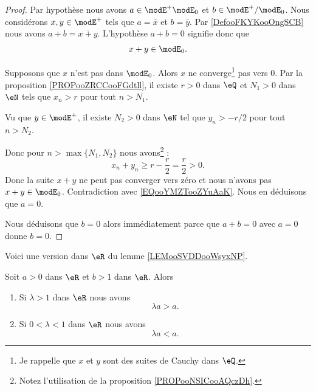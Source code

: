 \begin{proof}
	Par hypothèse nous avons \( a\in \modE^+\modE_0\) et \( b\in \modE^+/\modE_0\). Nous considérons \( x,y\in \modE^+\) tels que \( a=\bar x\) et \( b=\bar y\). Par \ref{DefooFKYKooOngSCB} nous avons \( a+b=\overline{x+y}\). L'hypothèse \( a+b=0\) signifie donc que
	\begin{equation}		\label{EQooYMZTooZYuAaK}
		x+y\in\modE_0.
	\end{equation}

	Supposons que \( x\) n'est pas dans \( \modE_0\). Alors \( x\) ne converge\footnote{Je rappelle que \( x\) et \( y\) sont des suites de Cauchy dans \( \eQ\).} pas vers \( 0\). Par la proposition \ref{PROPooZRCCooFGdtll}, il existe \( r>0\) dans \( \eQ\) et \( N_1>0\) dans \( \eN\) tels que \( x_n>r\) pour tout \( n>N_1\).

	Vu que \( y\in \modE^+\), il existe \( N_2>0\) dans \( \eN\) tel que \( y_n>-r/2\) pour tout \( n>N_2\).

	Donc pour \( n>\max\{ N_1,N_2 \}\) nous avons\footnote{Notez l'utilisation de la proposition \ref{PROPooNSICooAQczDh}.} :
	\begin{equation}
		x_n+y_n\geq r-\frac{ r }{2}=\frac{ r }{2}>0.
	\end{equation}
	Donc la suite \( x+y\) ne peut pas converger vers zéro et nous n'avons pas \( x+y\in\modE_0\). Contradiction avec \eqref{EQooYMZTooZYuAaK}. Nous en déduisons que \( a=0\).

	Nous déduisons que \( b=0\) alors immédiatement parce que \( a+b=0\) avec \( a=0\) donne \( b=0\).
\end{proof}

Voici une version dans \( \eR\) du lemme \ref{LEMooSVDDooWsyxNP}.
\begin{lemma}       \label{LEMooKAXFooIPyzJC}
	Soit \( a>0\) dans \( \eR\) et \( b>1\) dans \( \eR\). Alors
	\begin{enumerate}
		\item
		      Si \( \lambda>1\) dans \( \eR\) nous avons
		      \begin{equation}
			      \lambda a>a.
		      \end{equation}
		\item 		\label{ITEMooDIVAooDjQXRL}
		      Si \( 0<\lambda<1\) dans \( \eR\) nous avons
		      \begin{equation}
			      \lambda a<a.
		      \end{equation}
	\end{enumerate}
\end{lemma}

